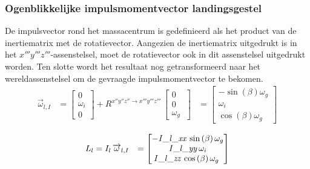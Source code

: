 \subsubsection{Ogenblikkelijke impulsmomentvector landingsgestel}
De impulsvector rond het massacentrum is gedefinieerd als het product van de inertiematrix met de rotatievector. Aangezien de inertiematrix uitgedrukt is in het $x'''y'''z'''$-assenstelsel, moet de rotatievector ook in dit assenstelsel uitgedrukt worden. 
Ten slotte wordt het resultaat nog getransformeerd naar het wereldassenstelsel om de gevraagde impulsmomentvector te bekomen.
\begin{equation*}
\begin{split}
\overrightarrow{\omega}_{l,I}
&=\begin{bmatrix}
0\\
\omega_{i}\\
0\
\end{bmatrix}
+R^{x''y''z'' \rightarrow x'''y'''z'''}\,
\begin{bmatrix}
0\\
0\\
\omega_{g}\
\end{bmatrix}
&=\begin{bmatrix}
-\sin \left( \beta \right) \omega_{g}
\\
\omega_{i}\\
\cos \left( \beta
 \right) \omega_{g}\
\end{bmatrix}
\end{split}
\end{equation*}

\begin{equation*}
\begin{split}
L_{l}&=I_{l}\,\overrightarrow{\omega}_{l,I}&=
\begin{bmatrix}
-{\it I\_l\_xx}\,\sin \left( \beta \right) 
\omega_{g}\\
{\it I\_l\_yy}\,\omega_{i}
\\
{\it I\_l\_zz}\,\cos \left( \beta \right) \omega_
{g}\
\end{bmatrix}
\end{split}
\end{equation*}

